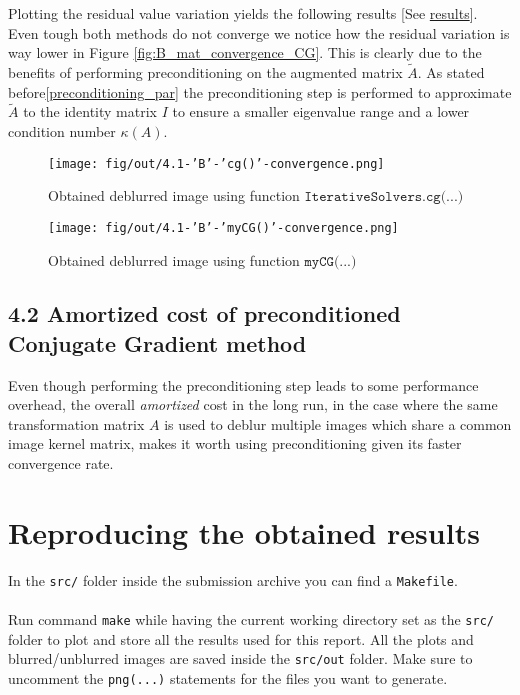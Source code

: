\documentclass[unicode,11pt,a4paper,oneside,numbers=endperiod,openany]{scrartcl}
\begin{document}
Plotting the residual value variation yields the following results [See \hyperref[fig:B_mat_convergence]{results}].\\
Even tough both methods do not converge we notice how the residual variation is way lower in Figure \ref{fig:B_mat_convergence_CG}. This is clearly due to the benefits of performing preconditioning on the augmented matrix $\tilde{A}$. As stated before\ref{preconditioning_par} the preconditioning step is performed to approximate $\tilde{A}$ to the identity matrix $I$ to ensure a smaller eigenvalue range and a lower condition number $\kappa(A)$.



\begin{figure}[h!]
    \begin{minipage}{.5\textwidth}
        \centering
        \texttt{[image: fig/out/4.1-'B'-'cg()'-convergence.png]}
        \caption{\small Obtained deblurred image using function $\texttt {IterativeSolvers.cg(...)}$}
        \label{fig:B_mat_convergence_CG}
    \end{minipage}
    \begin{minipage}{.5\textwidth}
        \centering
        \texttt{[image: fig/out/4.1-'B'-'myCG()'-convergence.png]}
        \caption{Obtained deblurred image using function $\texttt {myCG(...)}$}
    \end{minipage}
    \label{fig:B_mat_convergence}
\end{figure}


\subsection*{4.2 Amortized cost of preconditioned Conjugate Gradient method}
Even though performing the preconditioning step leads to some performance overhead, the overall \textit{amortized} cost in the long run, in the case where the same transformation matrix $A$ is used to deblur multiple images which share a common image kernel matrix, makes it worth using preconditioning given its faster convergence rate.

\section{Reproducing the obtained results}
In the \verb|src/| folder inside the submission archive you can find a \verb|Makefile|.\\\\
Run command \verb|make| while having the current working directory set as the \verb|src/| folder to plot and store all the results used for this report. All the plots and blurred/unblurred images are saved inside the \verb|src/out| folder. Make sure to uncomment the \verb|png(...)| statements for the files you want to generate.\\\\
\end{document}
